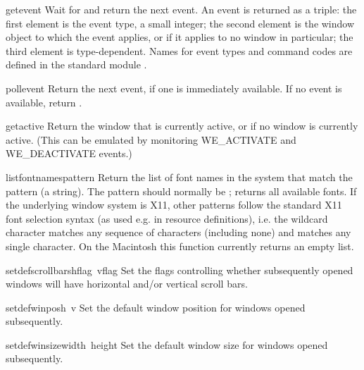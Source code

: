 \begin{funcdesc}{getevent}{}
Wait for and return the next event.
An event is returned as a triple: the first element is the event
type, a small integer; the second element is the window object to which
the event applies, or
if it applies to no window in particular;
the third element is type-dependent.
Names for event types and command codes are defined in the standard
module
.
\end{funcdesc}

\begin{funcdesc}{pollevent}{}
Return the next event, if one is immediately available.
If no event is available, return \code{()}.
\end{funcdesc}

\begin{funcdesc}{getactive}{}
Return the window that is currently active, or  if no
window is currently active.  (This can be emulated by monitoring
WE_ACTIVATE and WE_DEACTIVATE events.)
\end{funcdesc}

\begin{funcdesc}{listfontnames}{pattern}
Return the list of font names in the system that match the pattern (a
string).  The pattern should normally be ; returns all
available fonts.  If the underlying window system is X11, other
patterns follow the standard X11 font selection syntax (as used e.g.
in resource definitions), i.e. the wildcard character 
matches any sequence of characters (including none) and 
matches any single character.
On the Macintosh this function currently returns an empty list.
\end{funcdesc}

\begin{funcdesc}{setdefscrollbars}{hflag\, vflag}
Set the flags controlling whether subsequently opened windows will
have horizontal and/or vertical scroll bars.
\end{funcdesc}

\begin{funcdesc}{setdefwinpos}{h\, v}
Set the default window position for windows opened subsequently.
\end{funcdesc}

\begin{funcdesc}{setdefwinsize}{width\, height}
Set the default window size for windows opened subsequently.
\end{funcdesc}

